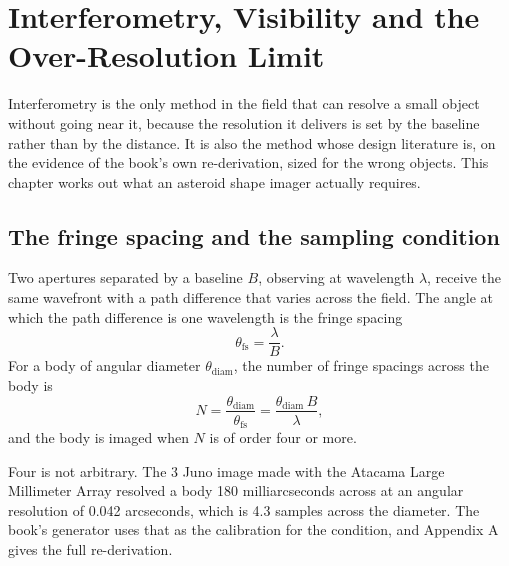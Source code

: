 
\chapter{Interferometry, Visibility and the Over-Resolution Limit}
\label{ch:interferometry}

Interferometry is the only method in the field that can resolve a small
object without going near it, because the resolution it delivers is set by
the baseline rather than by the distance. It is also the method whose
design literature is, on the evidence of the book's own re-derivation,
sized for the wrong objects. This chapter works out what an asteroid shape
imager actually requires.

\section{The fringe spacing and the sampling condition}

Two apertures separated by a baseline \(B\), observing at wavelength
\(\lambda\), receive the same wavefront with a path difference that varies
across the field. The angle at which the path difference is one wavelength
is the fringe spacing
\begin{equation}
\theta_{\mathrm{fs}} = \frac{\lambda}{B}.
\label{eq:fringe}
\end{equation}
For a body of angular diameter \(\theta_{\mathrm{diam}}\), the number of
fringe spacings across the body is
\begin{equation}
N = \frac{\theta_{\mathrm{diam}}}{\theta_{\mathrm{fs}}}
= \frac{\theta_{\mathrm{diam}}\, B}{\lambda},
\label{eq:samples}
\end{equation}
and the body is imaged when \(N\) is of order four or more.

Four is not arbitrary. The 3 Juno image made with the Atacama Large
Millimeter Array resolved a body 180 milliarcseconds across at an angular
resolution of 0.042 arcseconds, which is 4.3 samples across the diameter.
The book's generator uses that as the calibration for the condition, and
Appendix A gives the full re-derivation.

